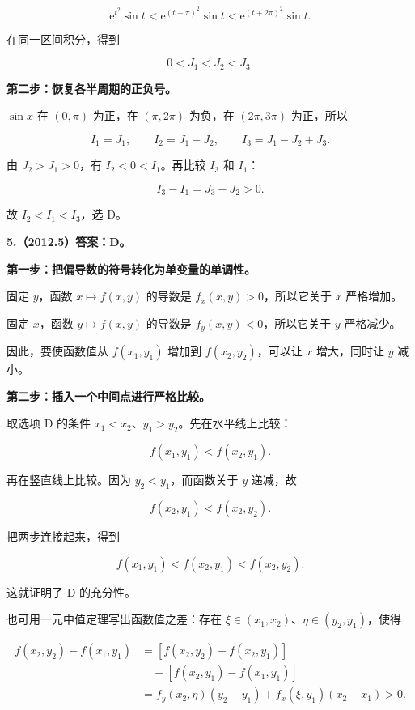 \documentclass[UTF8,11pt,fontset=windows]{ctexart}
\begin{document}
$$
\mathrm e^{t^2}\sin t
<\mathrm e^{(t+\pi)^2}\sin t
<\mathrm e^{(t+2\pi)^2}\sin t.
$$

在同一区间积分，得到

$$
0<J_1<J_2<J_3.
$$

\textbf{第二步：恢复各半周期的正负号。}

$\sin x$ 在 $(0,\pi)$ 为正，在 $(\pi,2\pi)$ 为负，在 $(2\pi,3\pi)$ 为正，所以

$$
I_1=J_1,
\qquad I_2=J_1-J_2,
\qquad I_3=J_1-J_2+J_3.
$$

由 $J_2>J_1>0$，有 $I_2<0<I_1$。再比较 $I_3$ 和 $I_1$：

$$
I_3-I_1=J_3-J_2>0.
$$

故 $I_2<I_1<I_3$，选 D。

\clearpage

\textbf{5.（2012.5）答案：D。}

\textbf{第一步：把偏导数的符号转化为单变量的单调性。}

固定 $y$，函数 $x\mapsto f(x,y)$ 的导数是 $f_x(x,y)>0$，所以它关于 $x$ 严格增加。

固定 $x$，函数 $y\mapsto f(x,y)$ 的导数是 $f_y(x,y)<0$，所以它关于 $y$ 严格减少。

因此，要使函数值从 $f(x_1,y_1)$ 增加到 $f(x_2,y_2)$，可以让 $x$ 增大，同时让 $y$ 减小。

\textbf{第二步：插入一个中间点进行严格比较。}

取选项 D 的条件 $x_1<x_2$、$y_1>y_2$。先在水平线上比较：

$$
f(x_1,y_1)<f(x_2,y_1).
$$

再在竖直线上比较。因为 $y_2<y_1$，而函数关于 $y$ 递减，故

$$
f(x_2,y_1)<f(x_2,y_2).
$$

把两步连接起来，得到

$$
f(x_1,y_1)<f(x_2,y_1)<f(x_2,y_2).
$$

这就证明了 D 的充分性。

也可用一元中值定理写出函数值之差：存在 $\xi\in(x_1,x_2)$、$\eta\in(y_2,y_1)$，使得

$$
\begin{aligned}
f(x_2,y_2)-f(x_1,y_1)
&=[f(x_2,y_2)-f(x_2,y_1)]\\
&\quad+[f(x_2,y_1)-f(x_1,y_1)]\\
&=f_y(x_2,\eta)(y_2-y_1)
+f_x(\xi,y_1)(x_2-x_1)>0.
\end{aligned}
$$
\end{document}
